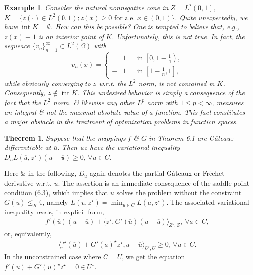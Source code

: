 \documentclass[oneside]{book}
\numberwithin{equation}{section}
\newtheorem{example}{Example}[chapter]
\newtheorem{theorem}{Theorem}[chapter]
\begin{document}
\begin{example}
	Consider the natural nonnegative cone in $Z = L^2(0,1)$, $K = \{z(\cdot)\in L^2(0,1);z(x)\ge 0\mbox{ for a.e. }x\in(0,1)\}$. Quite unexpectedly, we have $\operatorname{int}K = \emptyset$. How can this be possible? One is tempted to believe that, e.g., $z(x)\equiv 1$ is an interior point of $K$. Unfortunately, this is not true. In fact, the sequence $\{v_n\}_{n=1}^\infty\subset L^2(\Omega)$ with
	\begin{equation*}
		v_n(x) = \left\{\begin{split}
			&1&&\mbox{in }\left[0,1 - \frac{1}{n}\right),\\
			-&1&&\mbox{in }\left[1 - \frac{1}{n},1\right],
		\end{split}\right.
	\end{equation*}
	while obviously converging to $z$ w.r.t. the $L^2$ norm, is not contained in $K$. Consequently, $z\notin\operatorname{int} K$. This undesired behavior is simply a consequence of the fact that the $L^2$ norm, \& likewise any other $L^p$ norm with $1\le p < \infty$, measures an integral \& not the maximal absolute value of a function. This fact constitutes a major obstacle in the treatment of optimization problems in function spaces.
\end{example}

\begin{theorem}
	Suppose that the mappings $f$ \& $G$ in Theorem 6.1 are G\^ateaux differentiable at $\overline{u}$. Then we have the variational inequality $D_uL(\overline{u},z^\star)(u - \overline{u})\ge 0$, $\forall u\in C$.
\end{theorem}
Here \& in the following, $D_u$ again denotes the partial G\^ateaux or Fr\'echet derivative w.r.t. $u$. The assertion is an immediate consequence of the saddle point condition (6.3), which implies that $\overline{u}$ solves the problem without the constraint $G(u)\le_K 0$, namely $L(\overline{u},z^\star) = \min_{u\in C} L(u,z^\star)$. The associated variational inequality reads, in explicit form,
\begin{align*}
	f'(\overline{u})(u - \overline{u}) + \langle z^\star,G'(\overline{u})(u - \overline{u})\rangle_{Z^\star,Z},\ \forall u\in C,
\end{align*}
or, equivalently,
\begin{align*}
	\langle f'(\overline{u}) + G'(u)^\star z^\star,u - \overline{u}\rangle_{U^\star,U}\ge 0,\ \forall u\in C.
\end{align*}
In the unconstrained case where $C = U$, we get the equation $f'(\overline{u}) + G'(\overline{u})^\star z^\star = 0\in U^\star$.
\end{document}

